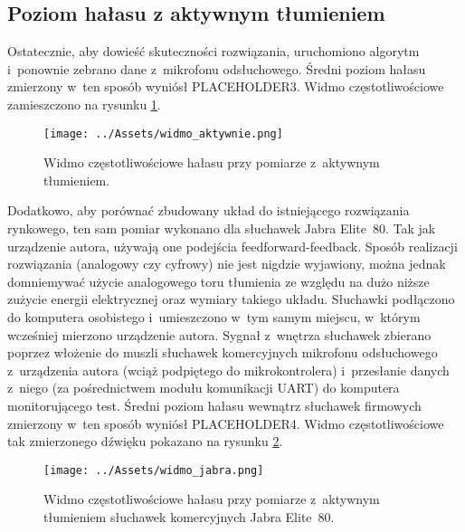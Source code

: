 \subsection{Poziom hałasu z aktywnym tłumieniem}
Ostatecznie, aby dowieść skuteczności rozwiązania, uruchomiono algorytm i~ponownie zebrano dane z~mikrofonu odsłuchowego. Średni poziom hałasu zmierzony w~ten sposób wyniósł PLACEHOLDER3. %
Widmo częstotliwościowe zamieszczono na rysunku \ref{fig:widmo_aktywnie}.
\begin{figure}[h!]
	\centering
	\texttt{[image: ../Assets/widmo\_aktywnie.png]}	
	\caption{Widmo częstotliwościowe hałasu przy pomiarze z~aktywnym tłumieniem.}
	\label{fig:widmo_aktywnie}
\end{figure}

Dodatkowo, aby porównać zbudowany układ do istniejącego rozwiązania rynkowego, ten sam pomiar wykonano dla słuchawek Jabra Elite~80. Tak jak urządzenie autora, używają one podejścia feedforward-feedback.\cite{JabraEvolve80} Sposób realizacji rozwiązania (analogowy czy cyfrowy) nie jest nigdzie wyjawiony, można jednak domniemywać użycie analogowego toru tłumienia ze względu na dużo niższe zużycie energii elektrycznej oraz wymiary takiego układu. Słuchawki podłączono do komputera osobistego i~umieszczono w~tym samym miejscu, w~którym wcześniej mierzono urządzenie autora. Sygnał z~wnętrza słuchawek zbierano poprzez włożenie do muszli słuchawek komercyjnych mikrofonu odsłuchowego z~urządzenia autora (wciąż podpiętego do mikrokontrolera) i~przesłanie danych z~niego (za pośrednictwem modułu komunikacji UART) do komputera monitorującego test. Średni poziom hałasu wewnątrz słuchawek firmowych zmierzony w~ten sposób wyniósł PLACEHOLDER4. Widmo częstotliwościowe tak zmierzonego dźwięku pokazano na rysunku \ref{fig:widmo_jabra}.
\begin{figure}[h!]
	\centering
	\texttt{[image: ../Assets/widmo\_jabra.png]}	
	\caption{Widmo częstotliwościowe hałasu przy pomiarze z~aktywnym tłumieniem słuchawek komercyjnych Jabra Elite~80.}
	\label{fig:widmo_jabra}
\end{figure}
